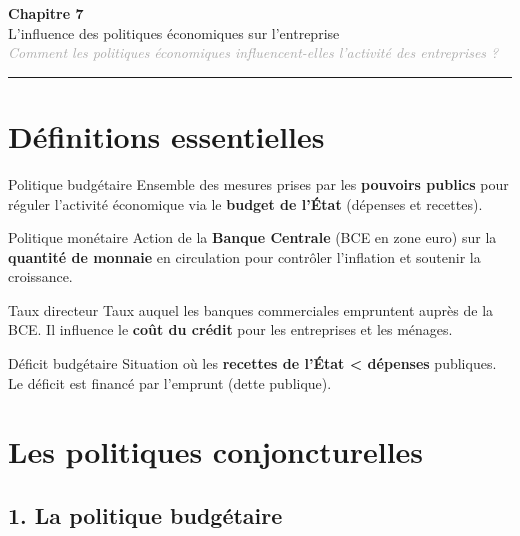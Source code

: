 \documentclass[11pt,a4paper]{article}
\begin{document}
\begin{center}
  {\Large\bfseries\textcolor{mainColor}{Chapitre 7}}\\[2pt]
  {\large L'influence des politiques économiques sur l'entreprise}\\[4pt]
  \textit{\textcolor{darkGray}{Comment les politiques économiques influencent-elles l'activité des entreprises ?}}
\end{center}
\vspace{4pt}\hrule\vspace{8pt}

\section*{Définitions essentielles}

\begin{defbox}{Politique budgétaire}
Ensemble des mesures prises par les \textbf{pouvoirs publics} pour réguler l'activité économique via le \textbf{budget de l'État} (dépenses et recettes).
\end{defbox}

\vspace{4pt}
\begin{defbox}{Politique monétaire}
Action de la \textbf{Banque Centrale} (BCE en zone euro) sur la \textbf{quantité de monnaie} en circulation pour contrôler l'inflation et soutenir la croissance.
\end{defbox}

\vspace{4pt}
\begin{defbox}{Taux directeur}
Taux auquel les banques commerciales empruntent auprès de la BCE. Il influence le \textbf{coût du crédit} pour les entreprises et les ménages.
\end{defbox}

\vspace{4pt}
\begin{defbox}{Déficit budgétaire}
Situation où les \textbf{recettes de l'État < dépenses} publiques. Le déficit est financé par l'emprunt (dette publique).
\end{defbox}

\section*{Les politiques conjoncturelles}

\subsection*{1. La politique budgétaire}
\end{document}
